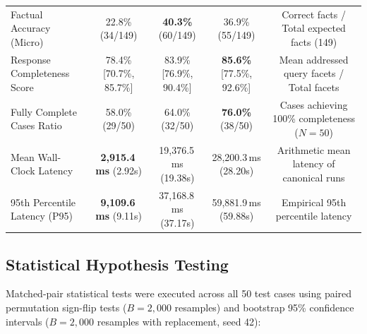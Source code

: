 \documentclass[conference]{IEEEtran}
\begin{document}
\begin{table}[t]
\begin{tabular}{lcccc}
Factual Accuracy (Micro) & 22.8\% (34/149) & \textbf{40.3\%} (60/149) & 36.9\% (55/149) & Correct facts / Total expected facts (149) \\
Response Completeness Score & 78.4\% [70.7\%, 85.7\%] & 83.9\% [76.9\%, 90.4\%] & \textbf{85.6\%} [77.5\%, 92.6\%] & Mean addressed query facets / Total facets \\
Fully Complete Cases Ratio & 58.0\% (29/50) & 64.0\% (32/50) & \textbf{76.0\%} (38/50) & Cases achieving 100\% completeness ($N=50$) \\
Mean Wall-Clock Latency & \textbf{2,915.4\,ms} (2.92s) & 19,376.5\,ms (19.38s) & 28,200.3\,ms (28.20s) & Arithmetic mean latency of canonical runs \\
95th Percentile Latency (P95) & \textbf{9,109.6\,ms} (9.11s) & 37,168.8\,ms (37.17s) & 59,881.9\,ms (59.88s) & Empirical 95th percentile latency \\
\bottomrule
\end{tabular}
\end{table}

\subsection{Statistical Hypothesis Testing}
Matched-pair statistical tests were executed across all 50 test cases using paired permutation sign-flip tests ($B=2,000$ resamples) and bootstrap 95\% confidence intervals ($B=2,000$ resamples with replacement, seed 42):
\end{document}
